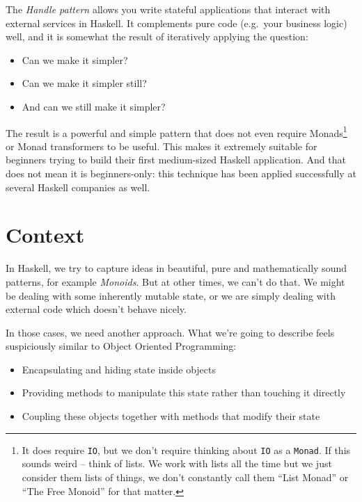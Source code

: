 The \emph{Handle pattern} allows you write stateful applications that
interact with external services in Haskell. It complements pure code
(e.g.~your business logic) well, and it is somewhat the result of
iteratively applying the question:

\begin{itemize}

\item
  Can we make it simpler?
\item
  Can we make it simpler still?
\item
  And can we still make it simpler?
\end{itemize}

The result is a powerful and simple pattern that does not even require
Monads\footnote{It does require \texttt{IO}, but we don't require thinking about
  \texttt{IO} as a \texttt{Monad}. If this sounds weird -- think of
  lists. We work with lists all the time but we just consider them lists
  of things, we don't constantly call them ``List Monad'' or ``The Free
  Monoid'' for that
  matter.}
or Monad transformers to be useful. This makes it extremely suitable for
beginners trying to build their first medium-sized Haskell application.
And that does not mean it is beginners-only: this technique has been
applied successfully at several Haskell companies as well.


\section{Context}

In Haskell, we try to capture ideas in beautiful, pure and
mathematically sound patterns, for example \emph{Monoids}. But at other
times, we can't do that. We might be dealing with some inherently
mutable state, or we are simply dealing with external code which doesn't
behave nicely.

In those cases, we need another approach. What we're going to describe
feels suspiciously similar to Object Oriented Programming:

\begin{itemize}

\item
  Encapsulating and hiding state inside objects
\item
  Providing methods to manipulate this state rather than touching it
  directly
\item
  Coupling these objects together with methods that modify their state
\end{itemize}


